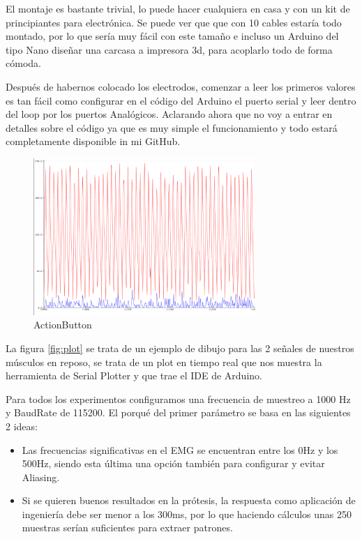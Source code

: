 El montaje es bastante trivial, lo puede hacer cualquiera en casa y con un kit de principiantes para electrónica. Se puede ver que que con 10 cables estaría todo montado, por lo que sería muy fácil con este tamaño e incluso un Arduino del tipo Nano diseñar una carcasa a impresora 3d, para acoplarlo todo de forma cómoda.

Después de habernos colocado los electrodos, comenzar a leer los primeros valores es tan fácil como configurar en el código del Arduino el puerto serial y leer dentro del loop por los puertos Analógicos. Aclarando ahora que no voy a entrar en detalles sobre el código ya que es muy simple el funcionamiento y todo estará completamente disponible in mi GitHub.\\ 

\begin{figure}[hp!]
\begin{center}
    \includegraphics[width=0.75\textwidth, scale=0.5]{imaxes/resting.png}
    \caption{ActionButton}
    \label{fig:plot}
  \end{center}
\end{figure}

La figura \autoref{fig:plot} se trata de un ejemplo de dibujo para las 2 señales de nuestros músculos en reposo, se trata de un plot en tiempo real que nos muestra la herramienta de Serial Plotter y que trae el IDE de Arduino.

Para todos los experimentos configuramos una frecuencia de muestreo a 1000 Hz y BaudRate de 115200. El porqué del primer parámetro se basa en las siguientes 2 ideas:

\begin{itemize}
  \item Las frecuencias significativas en el EMG se encuentran entre los 0Hz y los 500Hz, siendo esta última una opción también para configurar y evitar Aliasing. 
  \item Si se quieren buenos resultados en la prótesis, la respuesta como aplicación de ingeniería debe ser menor a los 300ms, por lo que haciendo cálculos unas 250 muestras serían suficientes para extraer patrones. 
\end{itemize}

